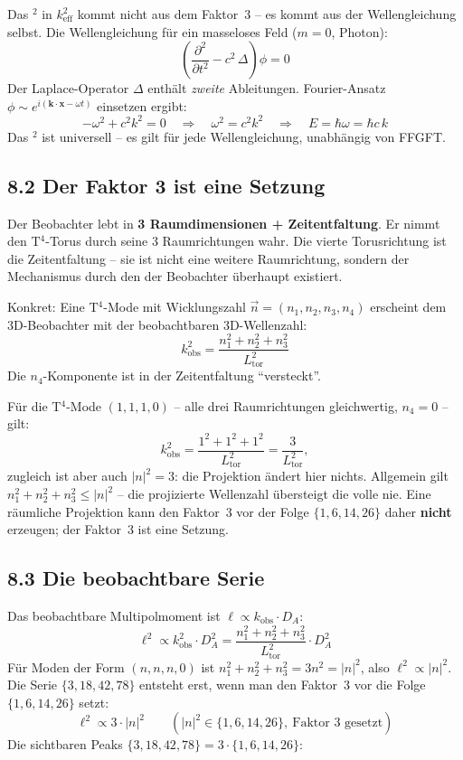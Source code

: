Das $^2$ in $k_\mathrm{eff}^2$ kommt nicht aus dem Faktor~3 --
es kommt aus der Wellengleichung selbst.
Die Wellengleichung für ein masseloses Feld ($m=0$, Photon):
\[
  \left(\frac{\partial^2}{\partial t^2} - c^2\,\Delta\right)\phi = 0
\]
Der Laplace-Operator $\Delta$ enthält \emph{zweite} Ableitungen.
Fourier-Ansatz $\phi \sim e^{i(\mathbf{k}\cdot\mathbf{x}-\omega t)}$
einsetzen ergibt:
\[
  -\omega^2 + c^2 k^2 = 0
  \quad\Rightarrow\quad
  \omega^2 = c^2 k^2
  \quad\Rightarrow\quad
  E = \hbar\omega = \hbar c\,k
\]
Das $^2$ ist universell -- es gilt für jede Wellengleichung,
unabhängig von FFGFT.

\subsection*{8.2 Der Faktor 3 ist eine Setzung}

Der Beobachter lebt in \textbf{3 Raumdimensionen + Zeitentfaltung}.
Er nimmt den T$^4$-Torus durch seine 3 Raumrichtungen wahr.
Die vierte Torusrichtung ist die Zeitentfaltung -- sie ist nicht
eine weitere Raumrichtung, sondern der Mechanismus durch den der
Beobachter überhaupt existiert.

Konkret: Eine T$^4$-Mode mit Wicklungszahl
$\vec{n} = (n_1, n_2, n_3, n_4)$ erscheint dem 3D-Beobachter
mit der beobachtbaren 3D-Wellenzahl:
\[
  k_\mathrm{obs}^2 = \frac{n_1^2 + n_2^2 + n_3^2}{L_\mathrm{tor}^2}
\]
Die $n_4$-Komponente ist in der Zeitentfaltung ``versteckt''.

Für die T$^4$-Mode $(1,1,1,0)$ -- alle drei Raumrichtungen
gleichwertig, $n_4 = 0$ -- gilt:
\[
  k_\mathrm{obs}^2 = \frac{1^2+1^2+1^2}{L_\mathrm{tor}^2}
  = \frac{3}{L_\mathrm{tor}^2},
\]
zugleich ist aber auch $|n|^2 = 3$: die Projektion ändert hier nichts.
Allgemein gilt $n_1^2+n_2^2+n_3^2 \le |n|^2$ -- die projizierte Wellenzahl
übersteigt die volle nie. Eine räumliche Projektion kann den Faktor~3 vor
der Folge $\{1,6,14,26\}$ daher \textbf{nicht} erzeugen; der Faktor~3 ist
eine Setzung.

\subsection*{8.3 Die beobachtbare Serie}

Das beobachtbare Multipolmoment ist
$\ell \propto k_\mathrm{obs} \cdot D_A$:
\[
  \ell^2 \propto k_\mathrm{obs}^2 \cdot D_A^2
  = \frac{n_1^2+n_2^2+n_3^2}{L_\mathrm{tor}^2} \cdot D_A^2
\]
Für Moden der Form $(n,n,n,0)$ ist $n_1^2+n_2^2+n_3^2=3n^2=|n|^2$, also
$\ell^2\propto|n|^2$. Die Serie $\{3,18,42,78\}$ entsteht erst, wenn man den
Faktor~3 vor die Folge $\{1,6,14,26\}$ setzt:
\[
  \ell^2 \propto 3 \cdot |n|^2 \qquad (|n|^2 \in \{1,6,14,26\},\ \text{Faktor~3 gesetzt})
\]
Die sichtbaren Peaks $\{3, 18, 42, 78\} = 3\cdot\{1, 6, 14, 26\}$:

